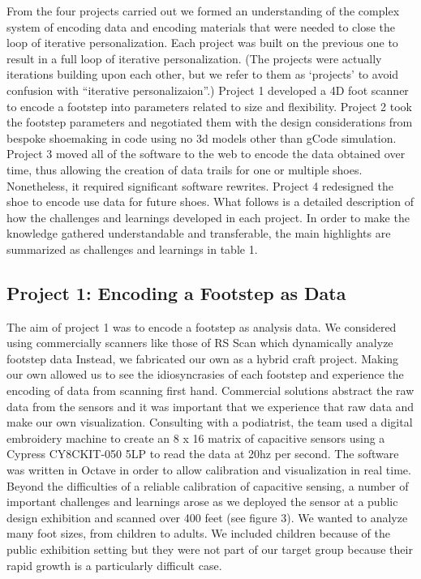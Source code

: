 From the four projects carried out we formed an understanding of the complex system of encoding data and encoding materials that were needed to close the loop of iterative personalization.  Each project was built on the previous one to result in a full loop of iterative personalization. (The projects were actually iterations building upon each other, but we refer to them as `projects' to avoid confusion with ``iterative personalizaion''.)  Project 1 developed a 4D foot scanner to encode a footstep into parameters related to size and flexibility. Project 2 took the footstep parameters and negotiated them with the design considerations from bespoke shoemaking in code using no 3d models other than gCode simulation. Project 3 moved all of the software to the web to encode the data obtained over time, thus allowing the creation of data trails for one or multiple shoes. Nonetheless, it required significant software rewrites. Project 4 redesigned the shoe to encode use data for future shoes. What follows is a detailed description of how the challenges and learnings developed in each project. In order to make the knowledge gathered understandable and transferable, the main highlights are summarized as challenges and learnings in table 1.

\subsection{Project 1: Encoding a Footstep as Data}

The aim of project 1 was to encode a footstep as analysis data. We considered using commercially scanners like those of RS Scan which dynamically analyze footstep data \cite{Franklyn-Miller2014} Instead, we fabricated our own as a hybrid craft project. Making our own allowed us to see the idiosyncrasies of each footstep and experience the encoding of data from scanning first hand. Commercial solutions abstract the raw data from the sensors and it was important that we experience that raw data and make our own visualization.  
Consulting with a podiatrist, the team used a digital embroidery machine to create an 8 x 16 matrix of capacitive sensors using a Cypress CY8CKIT-050 5LP to read the data at 20hz per second. The software was written in Octave in order to allow calibration and visualization in real time. Beyond the difficulties of a reliable calibration of capacitive sensing, a number of important challenges and learnings arose as we deployed the sensor at a public design exhibition and scanned over 400 feet (see figure 3). We wanted to analyze many foot sizes, from children to adults. We included children because of the public exhibition setting but they were not part of our target group because their rapid growth is a particularly difficult case.


